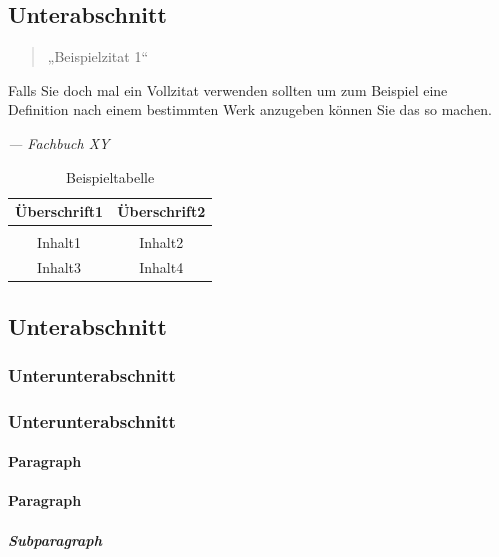 \subsection{Unterabschnitt}
\blindtext
\begin{quote}
	„Beispielzitat 1“ \cite{knuth:1984} \cite{IEEEexample:texfaq}
\end{quote}

\begin{formal}
	Falls Sie doch mal ein Vollzitat verwenden sollten um zum Beispiel eine Definition nach einem 		    bestimmten Werk anzugeben können Sie das so machen.
	\begin{flushright}
		\textit{--- Fachbuch XY \cite{IEEEexample:texfaq}}
	\end{flushright}
\end{formal}

\begin{table}[H]
	\centering
	\caption{Beispieltabelle}
	\begin{tabular}{c | c}
		\hline 
		\large{Überschrift1} & \large{Überschrift2} \\
		\hline \\
		Inhalt1 & Inhalt2\\
		Inhalt3 & Inhalt4\\
	\end{tabular}

\end{table}
\subsection{Unterabschnitt}
\blindtext
\subsubsection{Unterunterabschnitt}
\blindtext
\subsubsection{Unterunterabschnitt}
\blindtext
\paragraph{Paragraph}
\blindtext
\paragraph{Paragraph}
\blindtext
\subparagraph{Subparagraph}
\blindtext